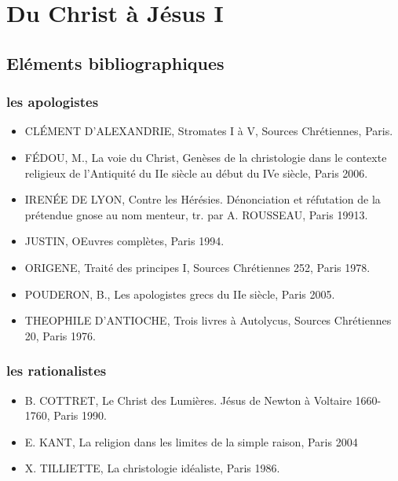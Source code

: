 \chapter{Du Christ à Jésus I}



 \section{Eléments bibliographiques }

 \subsection{les apologistes}
 \begin{itemize}
     \item CLÉMENT D’ALEXANDRIE, Stromates I à V, Sources Chrétiennes, Paris.
     \item FÉDOU, M., La voie du Christ, Genèses de la christologie dans le contexte religieux de
l’Antiquité du IIe siècle au début du IVe siècle, Paris 2006.
     \item IRENÉE DE LYON, Contre les Hérésies. Dénonciation et réfutation de la prétendue gnose au
nom menteur, tr. par A. ROUSSEAU, Paris 19913.
     \item JUSTIN, OEuvres complètes, Paris 1994.
     \item ORIGENE, Traité des principes I, Sources Chrétiennes 252, Paris 1978.
     \item POUDERON, B., Les apologistes grecs du IIe siècle, Paris 2005.
     \item THEOPHILE D’ANTIOCHE, Trois livres à Autolycus, Sources Chrétiennes 20, Paris 1976.
 \end{itemize}

\subsection{les rationalistes}
\begin{itemize}
    \item B. COTTRET, Le Christ des Lumières. Jésus de Newton à Voltaire 1660-1760, Paris 1990.
    \item E. KANT, La religion dans les limites de la simple raison, Paris 2004
    \item X. TILLIETTE, La christologie idéaliste, Paris 1986.
\end{itemize}

